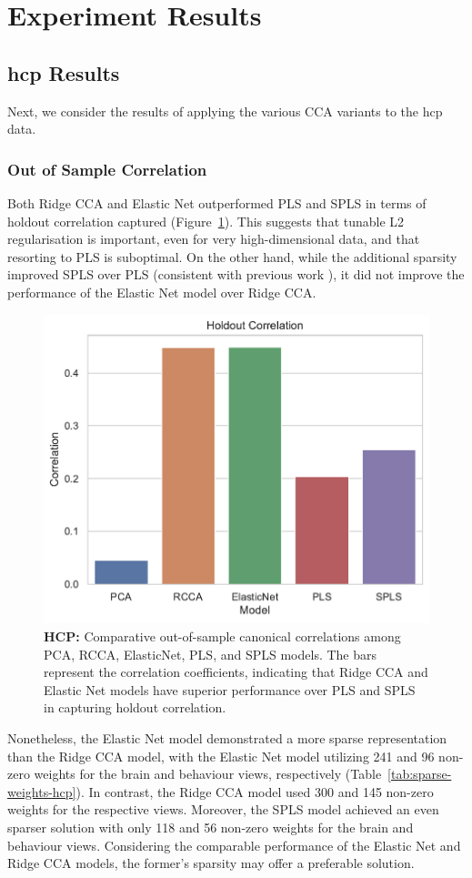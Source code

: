 \section{Experiment Results}

\subsection{\acrshort{hcp} Results}

Next, we consider the results of applying the various CCA variants to the \acrshort{hcp} data.

\subsubsection{Out of Sample Correlation}

Both Ridge CCA and Elastic Net outperformed PLS and SPLS in terms of holdout correlation captured (Figure~\ref{fig:performance}).
This suggests that tunable L2 regularisation is important, even for very high-dimensional data, and that resorting to PLS is suboptimal.
On the other hand, while the additional sparsity improved SPLS over PLS (consistent with previous work \cite{monteiro2016multiple}), it did not improve the performance of the Elastic Net model over Ridge CCA\@.

\begin{figure}[h]
    \centering
    \includegraphics[width=0.5\linewidth]{figures/hcp/holdout_correlations}
    \caption{\textbf{HCP:} Comparative out-of-sample canonical correlations among PCA, RCCA, ElasticNet, PLS, and SPLS models. The bars represent the correlation coefficients, indicating that Ridge CCA and Elastic Net models have superior performance over PLS and SPLS in capturing holdout correlation.}
    \label{fig:performance}
\end{figure}

Nonetheless, the Elastic Net model demonstrated a more sparse representation than the Ridge CCA model, with the Elastic Net model utilizing 241 and 96 non-zero weights for the brain and behaviour views, respectively (Table~\ref{tab:sparse-weights-hcp}). In contrast, the Ridge CCA model used 300 and 145 non-zero weights for the respective views.
Moreover, the SPLS model achieved an even sparser solution with only 118 and 56 non-zero weights for the brain and behaviour views. Considering the comparable performance of the Elastic Net and Ridge CCA models, the former's sparsity may offer a preferable solution.

